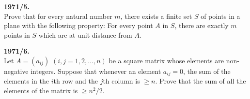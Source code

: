 \documentclass[12pt,a4paper]{article}
\begin{document}
\vspace{0.3cm}

\noindent \textbf{1971/5.} \\
Prove that for every natural number $m$, there exists a finite set $S$ of points in a plane with the following property: For every point $A$ in $S$, there are exactly $m$ points in $S$ which are at unit distance from $A$.

\vspace{0.3cm}

\noindent \textbf{1971/6.} \\
Let $A = (a_{ij})$ $(i, j = 1, 2, \ldots, n)$ be a square matrix whose elements are non-negative integers. Suppose that whenever an element $a_{ij} = 0$, the sum of the elements in the $i$th row and the $j$th column is $\geq n$. Prove that the sum of all the elements of the matrix is $\geq n^2/2$.
\end{document}
